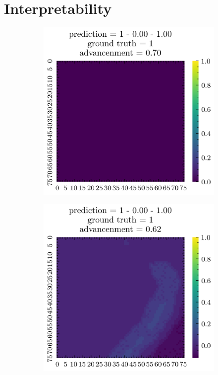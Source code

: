 \documentclass[../document.tex]{subfiles}
\begin{document}
\section{Interpretability}

\begin{figure}[H]
    \centering
    \begin{subfigure}[b]{0.19\textwidth}
        \includegraphics[width=\linewidth]{../img/5/quarry/best/patch-2d-0.png}
    \end{subfigure}
    \begin{subfigure}[b]{0.19\textwidth}
        \includegraphics[width=\linewidth]{../img/5/quarry/best/patch-2d-1.png}

\end{subfigure}
\end{figure}
\end{document}
